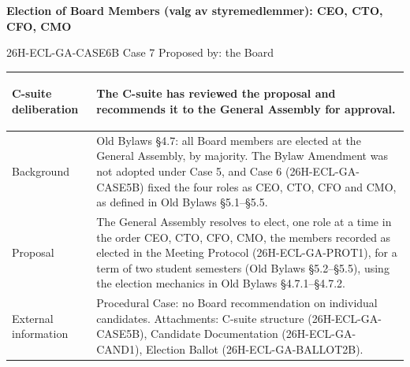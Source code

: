 \documentclass{../../../Common/Latex/Templates/rapport}
\begin{document}
\reportmainmatter
\small
\setlength{\parindent}{0pt}
\setlength{\tabcolsep}{6pt}
\renewcommand{\arraystretch}{1.2}

\begin{center}
  {\Large\bfseries Election of Board Members (valg av styremedlemmer): CEO, CTO, CFO, CMO}\par
  \vspace{0.15cm}
  {\normalsize 26H-ECL-GA-CASE6B \textperiodcentered{} Case 7 \textperiodcentered{} Proposed by: the Board}\par
  \vspace{0.1cm}
  {\small \meetingline}\par
\end{center}

\vspace{0.3cm}
\begin{tabularx}{\textwidth}{|>{\bfseries\raggedright\arraybackslash}p{4.2cm}|X|}
  \hline
  C-suite deliberation & The C-suite has reviewed the proposal and recommends it to the General Assembly for approval. \\
  \hline
  Background           & Old Bylaws \S4.7: all Board members are elected at the General Assembly, by majority. The Bylaw Amendment was not adopted under Case 5, and Case 6 (26H-ECL-GA-CASE5B) fixed the four roles as CEO, CTO, CFO and CMO, as defined in Old Bylaws \S5.1--\S5.5. \\
  \hline
  Proposal             & The General Assembly resolves to elect, one role at a time in the order CEO, CTO, CFO, CMO, the members recorded as elected in the Meeting Protocol (26H-ECL-GA-PROT1), for a term of two student semesters (Old Bylaws \S5.2--\S5.5), using the election mechanics in Old Bylaws \S4.7.1--\S4.7.2. \\
  \hline
  External information & Procedural Case: no Board recommendation on individual candidates. Attachments: C-suite structure (26H-ECL-GA-CASE5B), Candidate Documentation (26H-ECL-GA-CAND1), Election Ballot (26H-ECL-GA-BALLOT2B). \\
  \hline
\end{tabularx}
\end{document}
